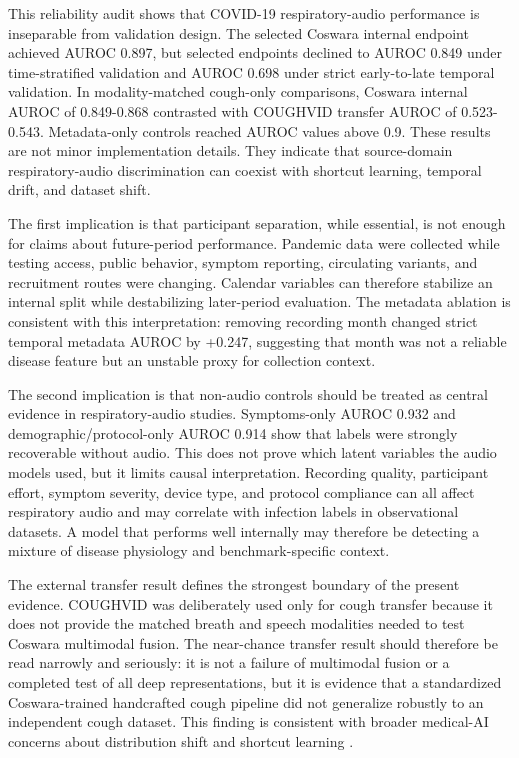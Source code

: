\documentclass[11pt]{article}
\begin{document}
This reliability audit shows that COVID-19 respiratory-audio performance is inseparable from validation design. The selected Coswara internal endpoint achieved AUROC 0.897, but selected endpoints declined to AUROC 0.849 under time-stratified validation and AUROC 0.698 under strict early-to-late temporal validation. In modality-matched cough-only comparisons, Coswara internal AUROC of 0.849-0.868 contrasted with COUGHVID transfer AUROC of 0.523-0.543. Metadata-only controls reached AUROC values above 0.9. These results are not minor implementation details. They indicate that source-domain respiratory-audio discrimination can coexist with shortcut learning, temporal drift, and dataset shift.

The first implication is that participant separation, while essential, is not enough for claims about future-period performance. Pandemic data were collected while testing access, public behavior, symptom reporting, circulating variants, and recruitment routes were changing. Calendar variables can therefore stabilize an internal split while destabilizing later-period evaluation. The metadata ablation is consistent with this interpretation: removing recording month changed strict temporal metadata AUROC by +0.247, suggesting that month was not a reliable disease feature but an unstable proxy for collection context.

The second implication is that non-audio controls should be treated as central evidence in respiratory-audio studies. Symptoms-only AUROC 0.932 and demographic/protocol-only AUROC 0.914 show that labels were strongly recoverable without audio. This does not prove which latent variables the audio models used, but it limits causal interpretation. Recording quality, participant effort, symptom severity, device type, and protocol compliance can all affect respiratory audio and may correlate with infection labels in observational datasets. A model that performs well internally may therefore be detecting a mixture of disease physiology and benchmark-specific context.

The external transfer result defines the strongest boundary of the present evidence. COUGHVID was deliberately used only for cough transfer because it does not provide the matched breath and speech modalities needed to test Coswara multimodal fusion. The near-chance transfer result should therefore be read narrowly and seriously: it is not a failure of multimodal fusion or a completed test of all deep representations, but it is evidence that a standardized Coswara-trained handcrafted cough pipeline did not generalize robustly to an independent cough dataset. This finding is consistent with broader medical-AI concerns about distribution shift and shortcut learning \citep{geirhos2020shortcut,roberts2021common}.
\end{document}
